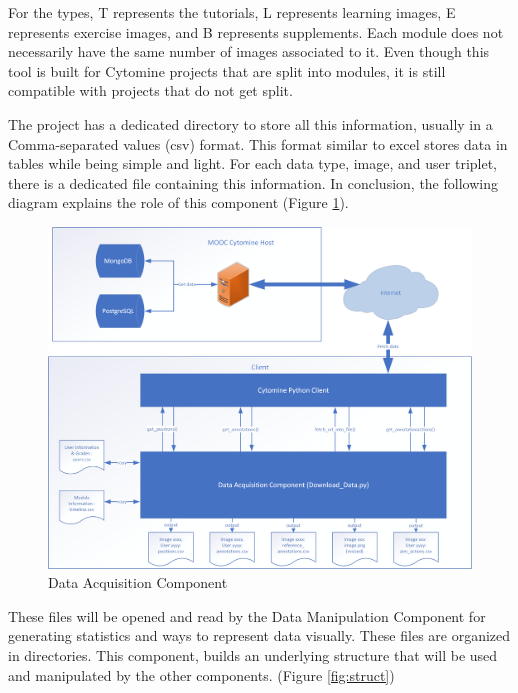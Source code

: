 \documentclass[a4paper,11pt]{report}
\numberwithin{figure}{chapter} %
\begin{document}
\begin{itemize}
            For the types, T represents the tutorials, L represents learning images, E represents exercise images, and B represents supplements.
            Each module does not necessarily have the same number of images associated to it.
            Even though this tool is built for Cytomine projects that are split into modules, it is still compatible with projects that do not get split.
        \end{itemize}


        The project has a dedicated directory to store all this information, usually in a Comma-separated values (csv) format.
        This format similar to excel stores data in tables while being simple and light.
        For each data type, image, and user triplet, there is a dedicated file containing this information.
        In conclusion, the following diagram explains the role of this component (Figure \ref{fig:comp1}).

       \begin{figure}[H]
        \centering
         \includegraphics[width=.8\linewidth]{diagrams/module1.png}
         \caption{Data Acquisition Component}
         \label{fig:comp1}
       \end{figure}

        These files will be opened and read by the Data Manipulation Component for generating statistics and ways to represent data visually.
        These files are organized in directories.
        This component, builds an underlying structure that will be used and manipulated by the other components. (Figure \ref{fig:struct})
\end{document}
